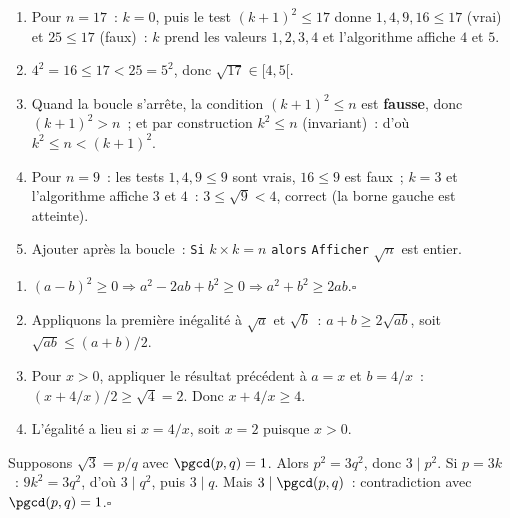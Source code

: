 \begin{enumerate}
  \item Pour $n=17$~: $k=0$, puis le test $(k+1)^2\le17$ donne $1,4,9,16\le17$ (vrai) et $25\le17$ (faux)~:
        $k$ prend les valeurs $1,2,3,4$ et l'algorithme affiche $4$ et $5$.
  \item $4^2=16\le17<25=5^2$, donc $\sqrt{17}\in[4,5[$.
  \item Quand la boucle s'arr\^ete, la condition $(k+1)^2\le n$ est \textbf{fausse}, donc $(k+1)^2>n$~; et par construction $k^2\le n$ (invariant)~: d'o\`u $k^2\le n<(k+1)^2$.
  \item Pour $n=9$~: les tests $1,4,9\le9$ sont vrais, $16\le9$ est faux~; $k=3$ et l'algorithme affiche $3$ et $4$~: $3\le\sqrt9<4$, correct (la borne gauche est atteinte).
  \item Ajouter apr\`es la boucle~: \texttt{Si} $k\times k=n$ \texttt{alors} \texttt{Afficher} \og $\sqrt{n}$ est entier\fg.
\end{enumerate}

\begin{enumerate}
  \item $(a-b)^2\geq0 \Rightarrow a^2-2ab+b^2\geq0 \Rightarrow a^2+b^2\geq2ab$.\hfill$\square$
  \item Appliquons la premi\`ere in\'egalit\'e \`a $\sqrt a$ et $\sqrt b$~:
        $a+b\geq2\sqrt{ab}$, soit $\sqrt{ab}\leq(a+b)/2$.
  \item Pour $x>0$, appliquer le r\'esultat pr\'ec\'edent \`a
        $a=x$ et $b=4/x$~: $(x+4/x)/2\geq\sqrt4=2$.
        Donc $x+4/x\geq4$.
  \item L'\'egalit\'e a lieu si $x=4/x$, soit $x=2$ puisque $x>0$.
\end{enumerate}


Supposons $\sqrt{3}=p/q$ avec $\pgcd(p,q)=1$.
Alors $p^2=3q^2$, donc $3\mid p^2$.
Si $p=3k$~: $9k^2=3q^2$, d'o\`u $3\mid q^2$, puis $3\mid q$.
Mais $3\mid\pgcd(p,q)$~: contradiction avec $\pgcd(p,q)=1$.\hfill$\square$


